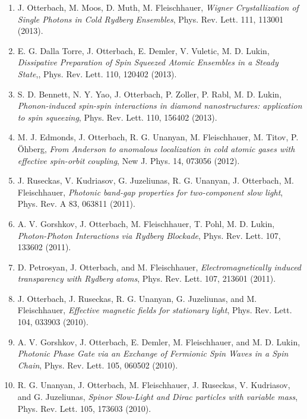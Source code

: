 \documentclass[10pt,centered]{./res} %
\begin{document}
\begin{resume}
\begin{enumerate}
  \item J. Otterbach, M. Moos, D. Muth, M. Fleischhauer, \textit{Wigner Crystallization of Single Photons in Cold Rydberg Ensembles}, Phys. Rev. Lett. 111, 113001 (2013).

  \item E. G. Dalla Torre, J. Otterbach, E. Demler, V. Vuletic, M. D. Lukin, \textit{Dissipative Preparation of Spin Squeezed Atomic Ensembles in a Steady State},, Phys. Rev. Lett. 110, 120402 (2013).

  \item S. D. Bennett, N. Y. Yao, J. Otterbach, P. Zoller, P. Rabl, M. D. Lukin, \textit{Phonon-induced spin-spin interactions in diamond nanostructures: application to spin squeezing}, Phys. Rev. Lett. 110, 156402 (2013).

  \item M. J. Edmonds, J. Otterbach, R. G. Unanyan, M. Fleischhauer, M. Titov, P. Öhberg, \textit{From Anderson to anomalous localization in cold atomic gases with effective spin-orbit coupling}, New J. Phys. 14, 073056 (2012).

  \item J. Ruseckas, V. Kudriasov, G. Juzeliunas, R. G. Unanyan, J. Otterbach, M. Fleischhauer, \textit{Photonic band-gap properties for two-component slow light}, Phys. Rev. A 83, 063811 (2011).

  \item A. V. Gorshkov, J. Otterbach, M. Fleischhauer, T. Pohl, M. D. Lukin, \textit{Photon-Photon Interactions via Rydberg Blockade}, Phys. Rev. Lett. 107, 133602 (2011).

  \item D. Petrosyan, J. Otterbach, and M. Fleischhauer, \textit{Electromagnetically induced transparency with Rydberg atoms}, Phys. Rev. Lett. 107, 213601 (2011).

  \item J. Otterbach, J. Ruseckas, R. G. Unanyan, G. Juzeliunas, and M. Fleischhauer, \textit{Effective magnetic fields for stationary light}, Phys. Rev. Lett. 104, 033903 (2010).

  \item A. V. Gorshkov, J. Otterbach, E. Demler, M. Fleischhauer, and M. D. Lukin, \textit{Photonic Phase Gate via an Exchange of Fermionic Spin Waves in a Spin Chain}, Phys. Rev. Lett. 105, 060502 (2010).

  \item R. G. Unanyan, J. Otterbach, M. Fleischhauer, J. Ruseckas, V. Kudriasov, and G. Juzeliunas, \textit{Spinor Slow-Light and Dirac particles with variable mass}, Phys. Rev. Lett. 105, 173603 (2010).


\end{enumerate}
\end{resume}
\end{document}
